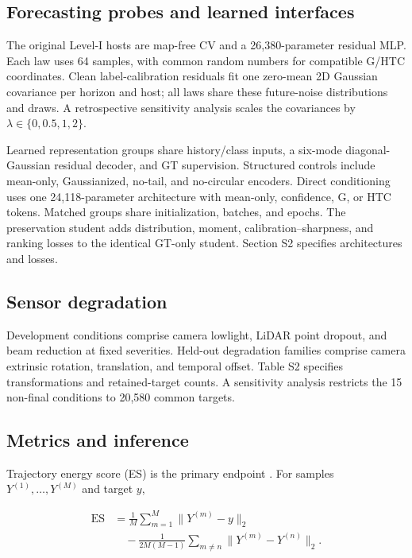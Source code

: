 \documentclass[lettersize,journal]{IEEEtran}
\begin{document}
\subsection{Forecasting probes and learned interfaces}
\label{subsec:section4-3}

The original Level-I hosts are map-free CV and a 26,380-parameter residual MLP. Each law uses 64 samples, with common random numbers for compatible G/HTC coordinates. Clean label-calibration residuals fit one zero-mean 2D Gaussian covariance per horizon and host; all laws share these future-noise distributions and draws. A retrospective sensitivity analysis scales the covariances by \(\lambda\in\{0,0.5,1,2\}\).

Learned representation groups share history/class inputs, a six-mode diagonal-Gaussian residual decoder, and GT supervision. Structured controls include mean-only, Gaussianized, no-tail, and no-circular encoders. Direct conditioning uses one 24,118-parameter architecture with mean-only, confidence, G, or HTC tokens. Matched groups share initialization, batches, and epochs. The preservation student adds distribution, moment, calibration--sharpness, and ranking losses to the identical GT-only student. Section S2 specifies architectures and losses.

\subsection{Sensor degradation}
\label{subsec:section4-4}

Development conditions comprise camera lowlight, LiDAR point dropout, and beam reduction at fixed severities. Held-out degradation families comprise camera extrinsic rotation, translation, and temporal offset. Table S2 specifies transformations and retained-target counts. A sensitivity analysis restricts the 15 non-final conditions to 20,580 common targets.

\subsection{Metrics and inference}
\label{subsec:section4-5}

Trajectory energy score (ES) is the primary endpoint \cite{ref32,ref33}. For samples \(Y^{(1)},\ldots,Y^{(M)}\) and target \(y\),

\begin{equation}
\label{eq:trajectory-energy-score}
\begin{aligned} \operatorname{ES} &=\frac{1}{M}\sum_{m=1}^{M}\lVert Y^{(m)}-y\rVert_2 \\ &\quad-\frac{1}{2M(M-1)}\sum_{m\ne n}\lVert Y^{(m)}-Y^{(n)}\rVert_2. \end{aligned}
\end{equation}
\end{document}
